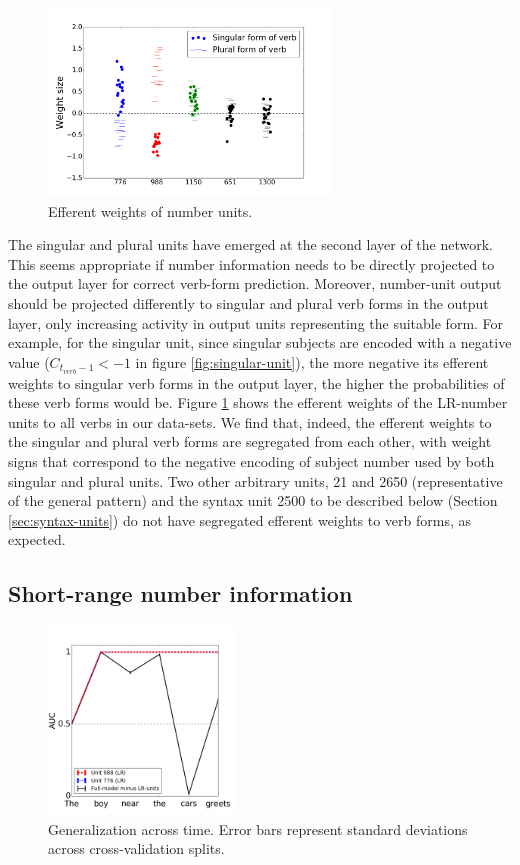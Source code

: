 \begin{figure}[b]
    \centering
    \includegraphics[height=5cm]{Figures/weight_dists_verbs.png}
    \caption{Efferent weights of number units.}
    \label{fig:output-weights}
\end{figure}

The singular and plural units have emerged at the second layer of the network. This seems appropriate if number information needs to be directly projected to the output layer for correct verb-form prediction. Moreover, number-unit output should be projected differently to singular and plural verb forms in the output layer, only increasing activity in output units representing the suitable form. For example, for the singular unit, since singular subjects are encoded with a negative value ($C_{t_{verb}-1}<-1$ in figure \ref{fig:singular-unit}), the more negative its efferent weights to singular verb forms in the output layer, the higher the probabilities of these verb forms would be. Figure \ref{fig:output-weights} shows the efferent weights of the LR-number units to all verbs in our data-sets. We find that, indeed, the efferent weights to the singular and plural verb forms are segregated from each other, with weight signs that correspond to the negative encoding of subject number used by both singular and plural units. Two other arbitrary units, \unit{2}{1} and \unit{2}{650} (representative of the general pattern) and the syntax unit \unit{2}{500} to be described below (Section \ref{sec:syntax-units}) do not have segregated efferent weights to verb forms, as expected. 

\subsection{Short-range number information}
\begin{figure}
    \centering
    \includegraphics[height=5cm]{Figures/GAT1d_cell_.png}
    \caption{Generalization across time. Error bars represent standard deviations across cross-validation splits.}
    \label{fig:GAT}
\end{figure}

